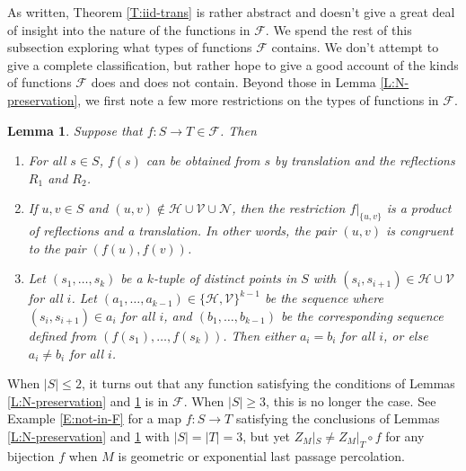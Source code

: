 \documentclass[aop, preprint]{imsart}
\theoremstyle{plain}
\newtheorem{lemma}[theorem]{Lemma}
\theoremstyle{definition}
\theoremstyle{plain}
\newcommand{\scrV}{\mathcal{V}}
\newcommand{\scrH}{\mathcal{H}}
\newcommand{\scrN}{\mathcal{N}}
\newcommand{\scrF}{\mathcal{F}}
\begin{document}
As written, Theorem \ref{T:iid-trans} is rather abstract and doesn't give a great deal of insight into the nature of the functions in $\scrF$. We spend the rest of this subsection exploring what types of functions $\scrF$ contains. We don't attempt to give a complete classification, but rather hope to give a good account of the kinds of functions $\scrF$ does and does not contain. Beyond those in Lemma \ref{L:N-preservation}, we first note a few more restrictions on the types of functions in $\scrF$.

\begin{lemma}
	\label{L:F-restrictions}
	Suppose that $f:S \to T \in \scrF$. Then 
	\begin{enumerate}[nosep, label=(\roman*)]
		\item For all $s \in S$, $f(s)$ can be obtained from $s$ by translation and the reflections $R_1$ and $R_2$.
		\item If $u, v \in S$ and $(u, v) \notin \scrH \cup \scrV \cup \scrN$, then the restriction $f|_{\{u, v\}}$ is a product of reflections and a translation. In other words, the pair $(u, v)$ is congruent to the pair $(f(u), f(v))$.
		\item Let $(s_1, \dots, s_k)$ be a $k$-tuple of distinct points in $S$ with $(s_i, s_{i+1}) \in \scrH \cup \scrV$ for all $i$. Let $(a_1, \dots, a_{k-1}) \in \{\scrH, \scrV\}^{k-1}$ be the sequence where $(s_i, s_{i+1}) \in a_i$ for all $i$, and $(b_1, \dots, b_{k-1})$ be the corresponding sequence defined from $(f(s_1), \dots, f(s_k))$. Then either $a_i = b_i$ for all $i$, or else $a_i \ne b_i$ for all $i$. 
	\end{enumerate}
\end{lemma}

When $|S| \le 2$, it turns out that any function satisfying the conditions of Lemmas \ref{L:N-preservation} and \ref{L:F-restrictions} is in $\scrF$. When $|S| \ge 3$, this is no longer the case. See Example \ref{E:not-in-F} for a map $f:S \to T$ satisfying the conclusions of Lemmas \ref{L:N-preservation} and \ref{L:F-restrictions} with $|S| = |T| = 3$, but yet $Z_M|_{S} \ne Z_M|_{T} \circ f$ for any bijection $f$ when $M$ is geometric or exponential last passage percolation. 
\end{document}
